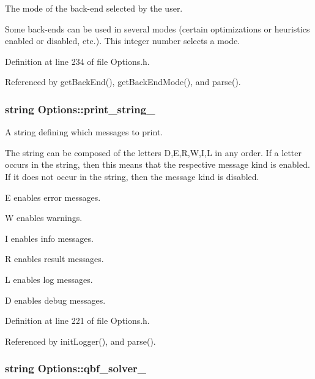 The mode of the back-\/end selected by the user. 

Some back-\/ends can be used in several modes (certain optimizations or heuristics enabled or disabled, etc.). This integer number selects a mode. 

Definition at line 234 of file Options.\-h.



Referenced by get\-Back\-End(), get\-Back\-End\-Mode(), and parse().

\hypertarget{classOptions_a6a29a69625b7962036c8c39746afc5c3}{
\subsubsection[{print\-\_\-string\-\_\-}]{\setlength{\rightskip}{0pt plus 5cm}string Options\-::print\-\_\-string\-\_\-\hspace{0.3cm}{\ttfamily [protected]}}}\label{classOptions_a6a29a69625b7962036c8c39746afc5c3}


A string defining which messages to print. 

The string can be composed of the letters D,E,R,W,I,L in any order. If a letter occurs in the string, then this means that the respective message kind is enabled. If it does not occur in the string, then the message kind is disabled. 
\begin{DoxyItemize}
\item E enables error messages. 
\item W enables warnings. 
\item I enables info messages. 
\item R enables result messages. 
\item L enables log messages. 
\item D enables debug messages. 
\end{DoxyItemize}

Definition at line 221 of file Options.\-h.



Referenced by init\-Logger(), and parse().

\hypertarget{classOptions_a07391a51f78315a8e8d2ecbeb8f57ddd}{
\subsubsection[{qbf\-\_\-solver\-\_\-}]{\setlength{\rightskip}{0pt plus 5cm}string Options\-::qbf\-\_\-solver\-\_\-\hspace{0.3cm}{\ttfamily [protected]}}}\label{classOptions_a07391a51f78315a8e8d2ecbeb8f57ddd}


